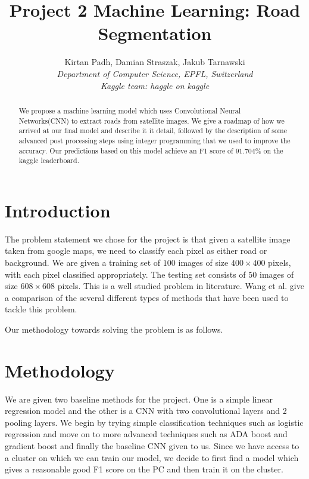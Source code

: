 \documentclass[10pt,conference,compsocconf]{IEEEtran}
\begin{document}
\title{Project 2 Machine Learning: Road Segmentation}

\author{
   Kirtan Padh, Damian Straszak, Jakub Tarnawski\\
    
  \textit{Department of Computer Science, EPFL, Switzerland}\\
  {\it Kaggle team: haggle on kaggle} \\
}

\maketitle

\begin{abstract}
We propose a machine learning model which uses Convolutional Neural Networks(CNN) to extract roads from satellite images. We give a roadmap of how we arrived at our final model and describe it it detail, followed by the description of some advanced post processing steps using integer programming that we used to improve the accuracy. Our predictions based on this model achieve an F1 score of $91.704\%$ on the kaggle leaderboard.
\end{abstract}

\section{Introduction}
The problem statement we chose for the project is that given a satellite image taken from google maps, we need to classify each pixel as either road or background. We are given a training set of $100$ images of size $400 \times 400$ pixels, with each pixel classified appropriately. The testing set consists of $50$ images of size $608 \times 608$ pixels. This is a well studied problem in literature. Wang et al.\cite{wang16} give a comparison of the several different types of methods that have been used to tackle this problem.

Our methodology towards solving the problem is as follows.

\section{Methodology}
We are given two baseline methods for the project. One is a simple linear regression model and the other is a CNN with two convolutional layers and 2 pooling layers. We begin by trying simple classification techniques such as logistic regression and move on to more advanced techniques such as ADA boost and gradient boost and finally the baseline CNN given to us. Since we have access to a cluster on which we can train our model, we decide to first find a model which gives a reasonable good F1 score on the PC and then train it on the cluster.
\end{document}
